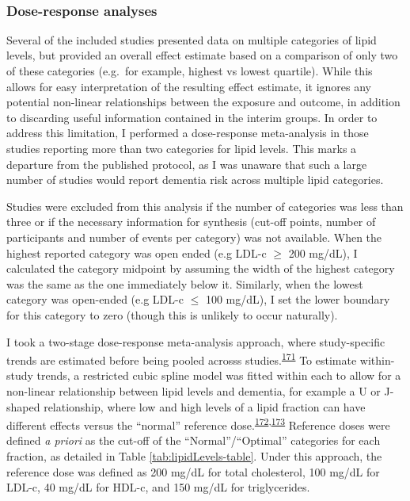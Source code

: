 \documentclass[a4paper, twoside]{templates/ociamthesis}
\begin{document}
~

\hypertarget{dose-response-analyses}{%
\subsubsection{Dose-response analyses}\label{dose-response-analyses}}

Several of the included studies presented data on multiple categories of lipid levels, but provided an overall effect estimate based on a comparison of only two of these categories (e.g.~for example, highest vs lowest quartile). While this allows for easy interpretation of the resulting effect estimate, it ignores any potential non-linear relationships between the exposure and outcome, in addition to discarding useful information contained in the interim groups. In order to address this limitation, I performed a dose-response meta-analysis in those studies reporting more than two categories for lipid levels. This marks a departure from the published protocol, as I was unaware that such a large number of studies would report dementia risk across multiple lipid categories.

Studies were excluded from this analysis if the number of categories was less than three or if the necessary information for synthesis (cut-off points, number of participants and number of events per category) was not available. When the highest reported category was open ended (e.g LDL-c \(\geqslant\) 200 mg/dL), I calculated the category midpoint by assuming the width of the highest category was the same as the one immediately below it. Similarly, when the lowest category was open-ended (e.g LDL-c \(\leqslant\) 100 mg/dL), I set the lower boundary for this category to zero (though this is unlikely to occur naturally).

I took a two-stage dose-response meta-analysis approach, where study-specific trends are estimated before being pooled acrosss studies.\textsuperscript{\protect\hyperlink{ref-greenland1992}{171}} To estimate within-study trends, a restricted cubic spline model was fitted within each to allow for a non-linear relationship between lipid levels and dementia, for example a U or J-shaped relationship, where low and high levels of a lipid fraction can have different effects versus the ``normal'' reference dose.\textsuperscript{\protect\hyperlink{ref-durrleman1989}{172},\protect\hyperlink{ref-liu2009}{173}}
Reference doses were defined \emph{a priori} as the cut-off of the ``Normal''/``Optimal'' categories for each fraction, as detailed in Table \ref{tab:lipidLevels-table}. Under this approach, the reference dose was defined as 200 mg/dL for total cholesterol, 100 mg/dL for LDL-c, 40 mg/dL for HDL-c, and 150 mg/dL for triglycerides.
\end{document}
